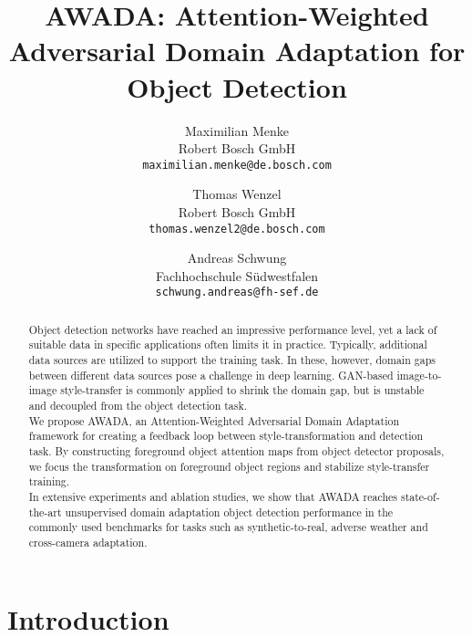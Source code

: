 \documentclass[10pt,twocolumn,letterpaper]{article}
\begin{document}
\title{AWADA: Attention-Weighted Adversarial Domain Adaptation for Object Detection}

\author{Maximilian Menke\\
Robert Bosch GmbH\\
{\tt\small maximilian.menke@de.bosch.com}
\and
Thomas Wenzel\\
Robert Bosch GmbH\\
{\tt\small thomas.wenzel2@de.bosch.com}
\and
Andreas Schwung\\
Fachhochschule Südwestfalen\\
{\tt\small schwung.andreas@fh-sef.de}
}

\maketitle


\begin{abstract}
   Object detection networks have reached an impressive performance level, yet a lack of suitable data in specific applications often limits it in practice. Typically, additional data sources are utilized to support the training task. In these, however, domain gaps between different data sources pose a challenge in deep learning. GAN-based image-to-image style-transfer is commonly applied to shrink the domain gap, but is unstable and decoupled from the object detection task. \\
   We propose AWADA, an Attention-Weighted Adversarial Domain Adaptation framework for creating a feedback loop between style-transformation and detection task. By constructing foreground object attention maps from object detector proposals, we focus the transformation on foreground object regions and stabilize style-transfer training. \\
   In extensive experiments and ablation studies, we show that AWADA reaches state-of-the-art unsupervised domain adaptation object detection performance in the commonly used benchmarks for tasks such as synthetic-to-real, adverse weather and cross-camera adaptation.
\end{abstract}

\section{Introduction}
\end{document}

